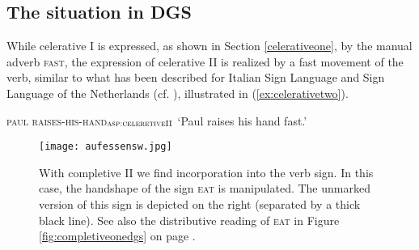 \noindent






\subsection{The situation in DGS}

While celerative I is expressed, as shown in Section \ref{celerativeone}, by the manual adverb \textsc{fast}, the expression of celerative II is realized by a fast movement of the verb, similar to what has been described for Italian Sign Language and Sign Language of the Netherlands (cf. \citealt{brunelli2011antisymmetry}), illustrated in (\ref{ex:celerativetwo}).

\begin{exe}
\ex\label{ex:celerativetwo}

{\textsc{paul raises-his-hand}$_{\textsc{asp:celeretiveII}}$}
\glt `Paul raises his hand fast.'
\end{exe}


\begin{figure}[bt]
\centering
	\texttt{[image: aufessensw.jpg]}
	\caption{With completive II we find incorporation into the verb sign. In this case, the handshape of the sign \textsc{eat} is manipulated. The unmarked version of this sign is depicted on the right (separated by a thick black line). See also the distributive reading of \textsc{eat} in Figure \ref{fig:completiveonedgs} on page \pageref{fig:completiveonedgs}.}
	\label{labelfigure}
\end{figure}

